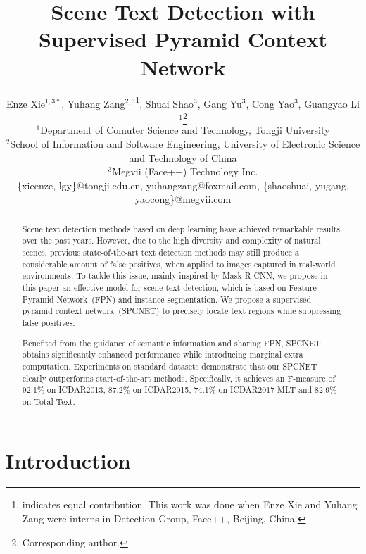 \documentclass[letterpaper]{article} \usepackage{aaai19}  \usepackage{times}  \usepackage{helvet}  \usepackage{courier}  \usepackage{url}  \usepackage{graphicx}
\begin{document}
\title{Scene Text Detection with Supervised Pyramid Context Network}
\author{
Enze Xie$^{1,3*}$, Yuhang Zang$^{2,3}$\thanks{ indicates equal contribution. This work was done when Enze Xie and Yuhang Zang were interns in Detection Group, Face++, Beijing, China.}, Shuai Shao$^{3}$, Gang Yu$^{3}$, Cong Yao$^{3}$, Guangyao Li$^{1}$\thanks{ Corresponding author.}\\
${^1}$Department of Comuter Science and Technology, Tongji University\\
${^2}$School of Information and Software Engineering,  University of Electronic Science and Technology of China\\
${^3}$Megvii (Face++) Technology Inc.\\
\{xieenze, lgy\}@tongji.edu.cn, yuhangzang@foxmail.com, \{shaoshuai, yugang, yaocong\}@megvii.com
}


\maketitle


\begin{abstract}
Scene text detection methods based on deep learning have achieved remarkable results over the past years.
However, due to the high diversity and complexity of natural scenes, previous state-of-the-art text detection methods may still produce a considerable amount of false positives, when applied to images captured in real-world environments. To tackle this issue, mainly inspired by Mask R-CNN, we propose in this paper an effective model for scene text detection, which is based on Feature Pyramid Network~(FPN) and instance segmentation. We propose a supervised pyramid context network~(SPCNET) to precisely locate text regions while suppressing false positives.

Benefited from the guidance of semantic information and sharing FPN, SPCNET obtains significantly enhanced performance while introducing marginal extra computation. Experiments on standard datasets demonstrate that our SPCNET clearly outperforms start-of-the-art methods. Specifically, it achieves an F-measure of 92.1\% on ICDAR2013, 87.2\% on ICDAR2015, 74.1\% on ICDAR2017 MLT and 82.9\% on Total-Text.
\end{abstract}

\section{Introduction}
\end{document}
